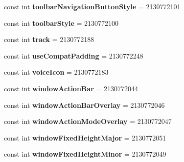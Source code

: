 \begin{DoxyCompactItemize}
const int {\bfseries toolbar\+Navigation\+Button\+Style} = 2130772101
\item 
\mbox{\label{classXaria_1_1Resource_1_1Attribute_a0295061ed4873dfcdbf9c0bc029407b5}} 
const int {\bfseries toolbar\+Style} = 2130772100
\item 
\mbox{\label{classXaria_1_1Resource_1_1Attribute_a47e0950d2c4f42ba3727d9b306a790fc}} 
const int {\bfseries track} = 2130772188
\item 
\mbox{\label{classXaria_1_1Resource_1_1Attribute_ad11ee599fd0d6abccabf1bd48afa6dca}} 
const int {\bfseries use\+Compat\+Padding} = 2130772248
\item 
\mbox{\label{classXaria_1_1Resource_1_1Attribute_a972d9409b5c8b81ff5f1badf3a04c7fb}} 
const int {\bfseries voice\+Icon} = 2130772183
\item 
\mbox{\label{classXaria_1_1Resource_1_1Attribute_aad0d4e9578cc83bd162d44d56d9e0a57}} 
const int {\bfseries window\+Action\+Bar} = 2130772044
\item 
\mbox{\label{classXaria_1_1Resource_1_1Attribute_aa863271fe92f666cdad3f3ac13665979}} 
const int {\bfseries window\+Action\+Bar\+Overlay} = 2130772046
\item 
\mbox{\label{classXaria_1_1Resource_1_1Attribute_ac1c97fe97a1601f0f7d55cf38823c675}} 
const int {\bfseries window\+Action\+Mode\+Overlay} = 2130772047
\item 
\mbox{\label{classXaria_1_1Resource_1_1Attribute_a476a1b11aeca5e679367ed0fe884dfe5}} 
const int {\bfseries window\+Fixed\+Height\+Major} = 2130772051
\item 
\mbox{\label{classXaria_1_1Resource_1_1Attribute_a582416447164637983138481f6446335}} 
const int {\bfseries window\+Fixed\+Height\+Minor} = 2130772049
\item 
\mbox{\label{classXaria_1_1Resource_1_1Attribute_a07050f167b59418816fb7883ab5073b8}} 

\end{DoxyCompactItemize}
